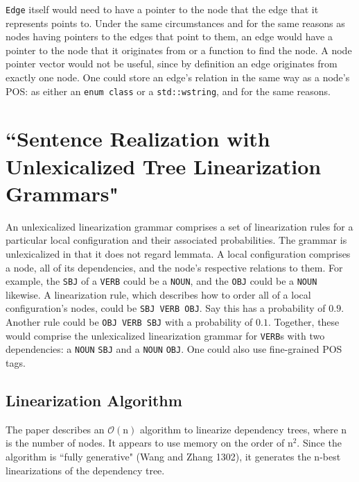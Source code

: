 \documentclass[12pt,letterpaper]{article}
\begin{document}
\begin{flushleft}
  \texttt{Edge} itself would need to have a pointer to the node that the edge that it represents points to. Under the same circumstances and for the same reasons as nodes having pointers to the edges that point to them, an edge would have a pointer to the node that it originates from or a function to find the node. A node pointer vector would not be useful, since by definition an edge originates from exactly one node. One could store an edge's relation in the same way as a node's POS: as either an \texttt{enum class} or a \texttt{std::wstring}, and for the same reasons.
  \section*{``Sentence Realization with Unlexicalized Tree Linearization Grammars"}
  An unlexicalized linearization grammar comprises a set of linearization rules for a particular local configuration and their associated probabilities. The grammar is unlexicalized in that it does not regard lemmata. A local configuration comprises a node, all of its dependencies, and the node's respective relations to them. For example, the \texttt{SBJ} of a \texttt{VERB} could be a \texttt{NOUN}, and the \texttt{OBJ} could be a \texttt{NOUN} likewise. A linearization rule, which describes how to order all of a local configuration's nodes, could be \texttt{SBJ VERB OBJ}. Say this has a probability of $0.9$. Another rule could be \texttt{OBJ VERB SBJ} with a probability of $0.1$. Together, these would comprise the unlexicalized linearization grammar for \texttt{VERB}s with two dependencies: a \texttt{NOUN} \texttt{SBJ} and a \texttt{NOUN} \texttt{OBJ}. One could also use fine-grained POS tags.
  \subsection*{Linearization Algorithm} The paper describes an $\mathcal{O}(\textrm{n})$ algorithm to linearize dependency trees, where $\textrm{n}$ is the number of nodes. It appears to use memory on the order of $\textrm{n}^{2}$. Since the algorithm is ``fully generative" (Wang and Zhang 1302), it generates the n-best linearizations of the dependency tree.


\end{flushleft}
\end{document}

